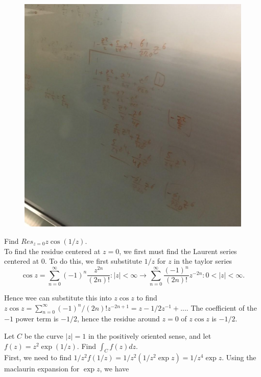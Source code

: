 \documentclass{article}
\theoremstyle{definition}
\newcommand{\infsum}{\sum_{n = 0}^{\infty}}
\newcommand{\cs}[1]{\color{blue}{#1}\normalcolor}
\begin{document}
\begin{figure}[htbp]
\centerline{\includegraphics[scale=0.5]{long_div2.png}}
\caption{}
\label{fig}
\end{figure}




 Find $Res_{z = 0}z\cos(1/z)$.\\

 To find the residue centered at $z = 0$, we first must find the Laurent series centered at $0$. To do this, we first substitute $1/z$ for $z$ in the taylor series $$
\cos z = \infsum (-1)^n\frac{z^{2n}}{(2n)!}:|z| < \infty\rightarrow \infsum \frac{(-1)^n}{(2n)!}z^{-2n}: 0<|z|<\infty.$$

Hence wee can substitute this into $z\cos z$ to find $z\cos z = \infsum(-1)^n/(2n)!z^{-2n +1} = z - 1/2z^{-1}+...$. The coefficient of the $-1$ power term is $-1/2$, hence the residue around $z = 0$ of $z\cos z$ is $-1/2$.\\

\cs{5/5}

 Let $C$ be the curve $|z| = 1$ in the positively oriented sense, and let $f(z) = z^2 \exp(1/z)$. Find $\int_C f(z)dz$.\\
 First, we need to find $1/z^2f(1/z) = 1/z^2(1/z^2\exp z) = 1/z^4 \exp z$. Using the maclaurin expansion for $\exp z$, we have \cs{a great start?} 
\end{document}
